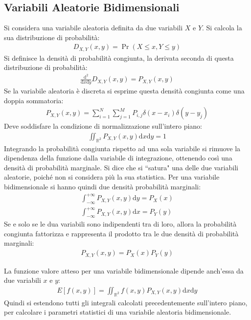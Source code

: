 \documentclass{article}
\newcommand{\df}{\mathrm{d}}
\numberwithin{equation}{subsection}
\begin{document}
\subsection{Variabili Aleatorie Bidimensionali}

Si considera una variabile aleatoria definita da due variabili $X$ e $Y$. Si calcola la sua distribuzione di probabilità:
\begin{gather}
    D_{X,Y}(x,y)=\Pr(X\leq x,Y\leq y)
\end{gather}
Si definisce la densità di probabilità congiunta, la derivata seconda di questa distribuzione di probabilità:
\begin{gather}
    \displaystyle\frac{\df^2}{\df x\df y}D_{X,Y}(x,y)=P_{X,Y}(x,y)
\end{gather}
Se la variabile aleatoria è discreta si esprime questa densità congiunta come una doppia sommatoria:
\begin{gather*}
    P_{X,Y}(x,y)=\displaystyle\sum_{i=1}^N\sum_{j=1}^MP_{i,j}\delta(x-x_i)\delta(y-y_j)
\end{gather*}
Deve soddisfare la condizione di normalizzazione sull'intero piano:
\begin{gather}
    \iint_{\mathbb{R}^2}P_{X,Y}(x,y)\df x\df y=1
\end{gather}
Integrando la probabilità congiunta rispetto ad una sola variabile si rimuove la dipendenza della funzione 
dalla variabile di integrazione, ottenendo così una densità di probabilità marginale. Si dice che si ``satura" una delle due variabili aleatorie, poiché non si considera più la sua statistica. Per una variabile 
bidimensionale si hanno quindi due densità probabilità marginali:
\begin{gather}
    \displaystyle\int_{-\infty}^{+\infty}P_{X,Y}(x,y)\df y=P_X(x)\\
    \displaystyle\int_{-\infty}^{+\infty}P_{X,Y}(x,y)\df x=P_Y(y)
\end{gather}
Se e solo se le dua variabili sono indipendenti tra di loro, allora la probabilità congiunta fattorizza e rappresenta il prodotto tra le due densità di probabilità marginali:
\begin{gather}
    P_{X,Y}(x,y)=P_X(x)P_Y(y)
\end{gather}

La funzione valore atteso per una variabile bidimensionale dipende anch'essa da due variabili $x$ e $y$:
\begin{gather}
    E[f(x,y)]=\displaystyle\iint_{\mathbb{R}^2}f(x,y)P_{X,Y}(x,y)\df x\df y
\end{gather}
Quindi si estendono tutti gli integrali calcolati precedentemente sull'intero piano, per calcolare i parametri statistici di una variabile aleatoria bidimensionale. 
\end{document}
